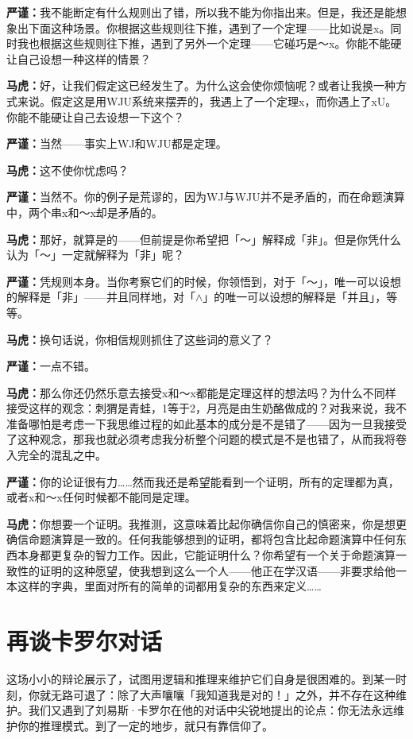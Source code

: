 \documentclass[
  12pt,
  twoside,
  openright,
  oldfontcommands,
]{memoir}
\newcommand{\dialogname}[1]{{\heifamily\bfseries #1}}
\begin{document}
\dialogname{严谨：}我不能断定有什么规则出了错，所以我不能为你指出来。但是，我还是能想象出下面这种场景。你根据这些规则往下推，遇到了一个定理------比如说是x。同时我也根据这些规则往下推，遇到了另外一个定理------它碰巧是～x。你能不能硬让自己设想一种这样的情景？

\dialogname{马虎：}好，让我们假定这已经发生了。为什么这会使你烦恼呢？或者让我换一种方式来说。假定这是用WJU系统来摆弄的，我遇上了一个定理x，而你遇上了xU。你能不能硬让自己去设想一下这个？

\dialogname{严谨：}当然------事实上WJ和WJU都是定理。

\dialogname{马虎：}这不使你忧虑吗？

\dialogname{严谨：}当然不。你的例子是荒谬的，因为WJ与WJU并不是矛盾的，而在命题演算中，两个串x和～x却是矛盾的。

\dialogname{马虎：}那好，就算是的------但前提是你希望把「～」解释成「非」。但是你凭什么认为「～」一定就解释为「非」呢？

\dialogname{严谨：}凭规则本身。当你考察它们的时候，你领悟到，对于「～」，唯一可以设想的解释是「非」------并且同样地，对「$\wedge$」的唯一可以设想的解释是「并且」，等等。

\dialogname{马虎：}换句话说，你相信规则抓住了这些词的意义了？

\dialogname{严谨：}一点不错。

\dialogname{马虎：}那么你还仍然乐意去接受x和～x都能是定理这样的想法吗？为什么不同样接受这样的观念：刺猬是青蛙，1等于2，月亮是由生奶酪做成的？对我来说，我不准备哪怕是考虑一下我思维过程的如此基本的成分是不是错了------因为一旦我接受了这种观念，那我也就必须考虑我分析整个问题的模式是不是也错了，从而我将卷入完全的混乱之中。

\dialogname{严谨：}你的论证很有力\ldots\ldots 然而我还是希望能看到一个证明，所有的定理都为真，或者x和～x任何时候都不能同是定理。

\dialogname{马虎：}你想要一个证明。我推测，这意味着比起你确信你自己的慎密来，你是想更确信命题演算是一致的。任何我能够想到的证明，都将包含比起命题演算中任何东西本身都更复杂的智力工作。因此，它能证明什么？你希望有一个关于命题演算一致性的证明的这种愿望，使我想到这么一个人------他正在学汉语------非要求给他一本这样的字典，里面对所有的简单的词都用复杂的东西来定义\ldots\ldots{}

\section{再谈卡罗尔对话}

这场小小的辩论展示了，试图用逻辑和推理来维护它们自身是很困难的。到某一时刻，你就无路可退了：除了大声嚷嚷「我知道我是对的！」之外，并不存在这种维护。我们又遇到了刘易斯·卡罗尔在他的对话中尖锐地提出的论点：你无法永远维护你的推理模式。到了一定的地步，就只有靠信仰了。
\end{document}
